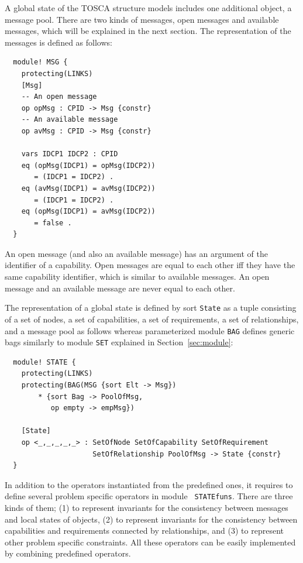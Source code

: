 \documentclass[12pt]{report}
\begin{document}
A global state of the TOSCA structure models includes one additional
object, a message pool. There are two kinds of messages, open messages
and available messages, which will be explained in the next
section. The representation of the messages is defined as follows:
\small
\begin{verbatim}
  module! MSG {
    protecting(LINKS)
    [Msg]
    -- An open message
    op opMsg : CPID -> Msg {constr}
    -- An available message
    op avMsg : CPID -> Msg {constr}
  
    vars IDCP1 IDCP2 : CPID 
    eq (opMsg(IDCP1) = opMsg(IDCP2))
       = (IDCP1 = IDCP2) .
    eq (avMsg(IDCP1) = avMsg(IDCP2))
       = (IDCP1 = IDCP2) .
    eq (opMsg(IDCP1) = avMsg(IDCP2))
       = false .
  }    
\end{verbatim}
\normalsize
An open message (and also an available message) has an argument of the
identifier of a capability. Open messages are equal to each other iff
they have the same capability identifier, which is similar to
available messages. An open message and an available message are never
equal to each other.

The representation of a global state is defined by sort {\tt State} as
a tuple consisting of a set of nodes, a set of capabilities, a set of
requirements, a set of relationships, and a message pool as follows
whereas parameterized module {\tt BAG} defines generic bags similarly
to module {\tt SET} explained in Section~\ref{sec:module}:
\small
\begin{verbatim}
  module! STATE {
    protecting(LINKS)
    protecting(BAG(MSG {sort Elt -> Msg})
        * {sort Bag -> PoolOfMsg,
           op empty -> empMsg})
  
    [State]
    op <_,_,_,_,_> : SetOfNode SetOfCapability SetOfRequirement 
                     SetOfRelationship PoolOfMsg -> State {constr}
  }
\end{verbatim}
\normalsize

In addition to the operators instantiated from the predefined ones, it
requires to define several problem specific operators in module {\tt
  STATEfuns}. There are three kinds of them; (1) to represent
invariants for the consistency between messages and local states of
objects, (2) to represent invariants for the consistency between
capabilities and requirements connected by relationships, and (3) to
represent other problem specific constraints. All these operators can
be easily implemented by combining predefined operators.
\end{document}
